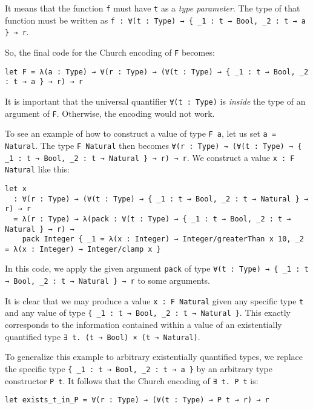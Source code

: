 It means that the function \lstinline!f! must have \lstinline!t! as a \emph{type parameter}.
The type of that function must be written as \lstinline!f : ∀(t : Type) → { _1 : t → Bool, _2 : t → a } → r!. 


So, the final code for the Church encoding of \lstinline!F! becomes:


\begin{lstlisting}[language=Dhall]
let F = λ(a : Type) → ∀(r : Type) → (∀(t : Type) → { _1 : t → Bool, _2 : t → a } → r) → r
\end{lstlisting}


It is important that the universal quantifier \lstinline!∀(t : Type)! is \emph{inside} the type of an argument of \lstinline!F!.
Otherwise, the encoding would not work.


To see an example of how to construct a value of type \lstinline!F a!, let us set \lstinline!a = Natural!.
The type \lstinline!F Natural! then becomes \lstinline!∀(r : Type) → (∀(t : Type) → { _1 : t → Bool, _2 : t → Natural } → r) → r!.
We construct a value \lstinline!x : F Natural! like this:


\begin{lstlisting}[language=Dhall]
let x
  : ∀(r : Type) → (∀(t : Type) → { _1 : t → Bool, _2 : t → Natural } → r) → r
  = λ(r : Type) → λ(pack : ∀(t : Type) → { _1 : t → Bool, _2 : t → Natural } → r) →
    pack Integer { _1 = λ(x : Integer) → Integer/greaterThan x 10, _2 = λ(x : Integer) → Integer/clamp x }
\end{lstlisting}


In this code, we apply the given argument \lstinline!pack! of type \lstinline!∀(t : Type) → { _1 : t → Bool, _2 : t → Natural } → r! to some arguments.


It is clear that we may produce a value \lstinline!x : F Natural! given any specific type \lstinline!t! and any value of type \lstinline!{ _1 : t → Bool, _2 : t → Natural }!.  
This exactly corresponds to the information contained within a value of an existentially quantified type \lstinline!∃ t. (t → Bool) × (t → Natural)!.


To generalize this example to arbitrary existentially quantified types, we replace the specific type \lstinline!{ _1 : t → Bool, _2 : t → a }! by an arbitrary type constructor \lstinline!P t!.
It follows that the Church encoding of \lstinline!∃ t. P t! is:


\begin{lstlisting}[language=Dhall]
let exists_t_in_P = ∀(r : Type) → (∀(t : Type) → P t → r) → r
\end{lstlisting}


